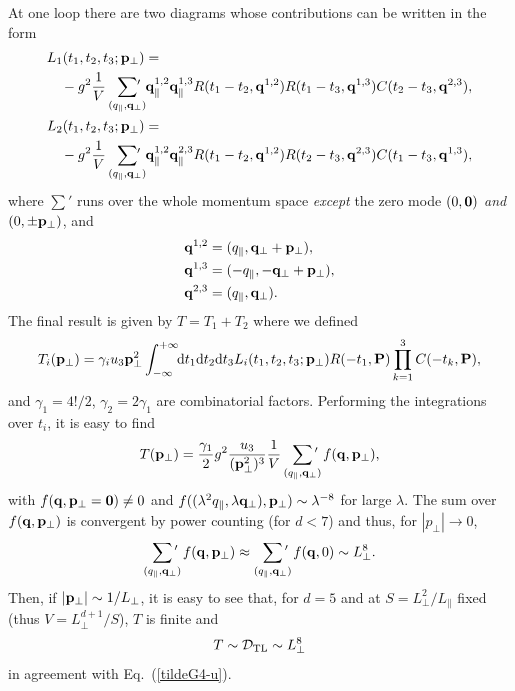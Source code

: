 \documentclass[12pt]{article}
\begin{document}
At one loop there are two diagrams whose contributions can be written in the 
form
\begin{align}
&L_1(t_1,t_2,t_3;\ve{p}_\perp) = \nonumber \\
&\quad - g^2 \frac{1}{V}\sum_{(q_\|,\ve{q}_\perp)}\!\!\!\!\!'\ \ve{q}^{1,2}_\| \ve{q}^{1,3}_\|
R(t_1-t_2,\ve{q}^{1,2}) R(t_1-t_3,\ve{q}^{1,3}) C(t_2-t_3,\ve{q}^{2,3}),\\
&L_2(t_1,t_2,t_3;\ve{p}_\perp) = \nonumber \\
&\quad - g^2 \frac{1}{V}\sum_{(q_\|,\ve{q}_\perp)}\!\!\!\!\!' \ \ve{q}^{1,2}_\| \ve{q}^{2,3}_\|
R(t_1-t_2,\ve{q}^{1,2}) R(t_2-t_3,\ve{q}^{2,3}) C(t_1-t_3,\ve{q}^{1,3}),
\end{align}
where $\sum'$ runs over the whole momentum space {\it except} the zero
mode $(0,{\bf 0})$ {\it and} $(0,\pm{\bf p}_\perp)$, and 
\begin{align}
&{\bf q}^{1,2} = (q_\|, {\bf q}_\perp + {\bf p}_\perp), \\ 
&{\bf q}^{1,3} = (-q_\|, -{\bf q}_\perp + {\bf p}_\perp),\\
&{\bf q}^{2,3} = (q_\|, {\bf q}_\perp).
\end{align}
The final result is given by $T = T_1+T_2$ where we defined
\begin{equation}
T_i({\bf p}_\perp) = 
\gamma_i u_3 {\bf p}^2_\perp\int_{-\infty}^{+\infty}\!\!{\rm d} t_1{\rm d}
t_2 {\rm d} t_3 
L_i(t_1,t_2,t_3;{\bf p}_\perp) R(-t_1,{\bf P})\prod_{k=1}^3 C(-t_k,{\bf P}),
\end{equation}
and $\gamma_1 = 4!/2$, $\gamma_2 = 2\gamma_1$ are combinatorial factors.
Performing the integrations over $t_i$, it is easy to find
\begin{equation}
T(\ve{p}_\perp) = \frac{\gamma_1}{2}g^2\frac{u_3}{(\ve{p}_\perp^2)^3}
 \frac{1}{V}\sum_{(q_\|,\ve{q}_\perp)}\!\!\!\!' \ f(\ve{q},\ve{p}_\perp),
\end{equation}
with $f({\bf q},{\bf p}_\perp = {\bf 0}) \not= 0$ and $f((\lambda^2 q_\|,
\lambda {\bf q}_\perp),{\bf p}_\perp)\sim \lambda^{-8}$ for large
$\lambda$. 
The sum over 
$f({\bf q},{\bf p}_\perp)$ is convergent by power counting (for $d < 7$)
and thus, for $|p_\bot| \to 0$, 
\begin{equation}
\sum_{(q_\|,\ve{q}_\perp)}\!\!\!\!' \ f(\ve{q},\ve{p}_\perp) 
\approx \sum_{(q_\|,\ve{q}_\perp)}\!\!\!\!' \ f(\ve{q},0) \sim L_\bot^8.
\end{equation}
Then, if $|{\bf p}_\perp|\sim 1/L_\perp$, it is easy to see that, for
$d=5$ and at $S = L_\perp^2/L_\|$ fixed
(thus $V = L_\perp^{d+1}/S$), $T$ is finite and
\begin{equation}
T \sim {\cal D}_{\rm TL} \sim L_\perp^8
\end{equation}
in agreement with Eq.~(\ref{tildeG4-u}).
\end{document}
